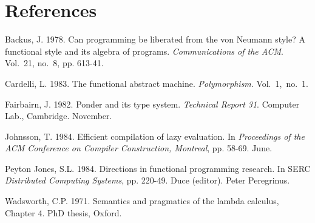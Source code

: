 \vspace{-2\baselineskip}

\section*{References}

\begin{references}
\item Backus, J. 1978. Can programming be liberated from the von Neumann style? A
functional style and its algebra of programs. \textit{Communications of the ACM}. Vol.~21, no.~8, pp. 613-41.
\item Cardelli, L. 1983. The functional abstract machine. \textit{Polymorphism}. Vol.~1,~no.~1.
\item Fairbairn, J. 1982. Ponder and its type system. \textit{Technical Report 31}. Computer Lab.,
Cambridge. November.
\item Johnsson, T. 1984. Efficient compilation of lazy evaluation. In \textit{Proceedings of the ACM
Conference on Compiler Construction, Montreal}, pp. 58-69. June.
\item Peyton Jones, S.L. 1984. Directions in functional programming research. In SERC
\textit{Distributed Computing Systems}, pp. 220-49. Duce (editor). Peter Peregrinus.
\item Wadsworth, C.P. 1971. Semantics and pragmatics of the lambda calculus, Chapter 4.
PhD thesis, Oxford.

\end{references}
